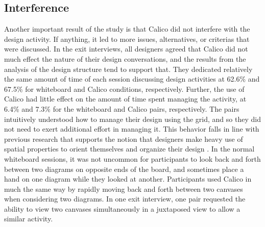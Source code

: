 \documentclass[12pt,fleqn]{ucithesis}
\begin{document}
\subsection {Interference}
\label{discussion:3}

Another important result of the study is that Calico did not interfere with the design activity. If anything, it led to more issues, alternatives, or criterias that were discussed. In the exit interviews, all designers agreed that Calico did not much effect the nature of their design conversations, and the results from the analysis of the design structure tend to support that. They dedicated relatively the same amount of time of each session discussing design activities at 62.6\% and 67.5\% for whiteboard and Calico conditions, respectively. Further, the use of Calico had little effect on the amount of time spent managing the activity, at 6.4\% and 7.3\% for the whiteboard and Calico pairs, respectively. The pairs intuitively understood how to manage their design using the grid, and so they did not need to exert additional effort in managing it. This behavior falls in line with previous research that supports the notion that designers make heavy use of spatial properties to orient themselves and organize their design \citep{Nickerson,Brooksa}. In the normal whiteboard sessions, it was not uncommon for participants to look back and forth between two diagrams on opposite ends of the board, and sometimes place a hand on one diagram while they looked at another. Participants used Calico in much the same way by rapidly moving back and forth between two canvases when considering two diagrams. In one exit interview, one pair requested the ability to view two canvases simultaneously in a juxtaposed view to allow a similar activity. 
\end{document}
